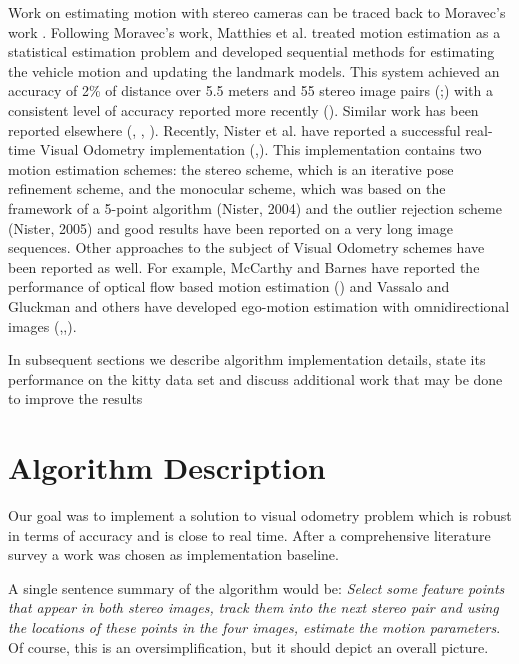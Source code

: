 \documentclass[10pt]{article}         %
\begin{document}
Work on estimating motion with stereo cameras can be traced back to Moravec's work \cite{Moravec:1980:OAN:909315}. Following Moravec's work, Matthies et al. treated motion estimation as a statistical estimation problem and developed sequential methods for estimating the vehicle motion and updating the landmark models. This system achieved an accuracy of 2\% of distance over 5.5 meters and 55 stereo image pairs (\cite{Matthies87errormodeling};\cite{Matthies:1989:DSV:916891}) with a consistent level of accuracy reported more recently (\cite{olson2003rover}). Similar work has been reported elsewhere (\cite{zhang1988analysis}, \cite{lacroix1999rover}, \cite{nister2004visual}). Recently, Nister et al. have reported a successful real-time Visual Odometry implementation (\cite{nister2006visual},\cite{nister2004efficient}). This implementation contains two motion estimation schemes: the stereo scheme, which is an iterative pose refinement scheme, and the monocular scheme, which was based on the framework of a 5-point algorithm (Nister, 2004) and the outlier rejection scheme (Nister, 2005) and good results have been reported on a very long image sequences. Other approaches to the subject of Visual Odometry schemes have been reported as well.  For example, McCarthy and Barnes have reported the performance of optical flow based motion estimation (\cite{mccarthy2004performance}) and Vassalo and Gluckman and others have developed ego-motion estimation with omnidirectional images (\cite{vassallo2002general},\cite{gluckman1998},\cite{corke2004omnidirectional}).

In subsequent sections we describe algorithm implementation details, state its performance on the kitty data set and discuss additional work that may be done to improve the results


\section{Algorithm Description}
Our goal was to implement a solution to visual odometry problem which is robust in terms of accuracy and is close to real time. After a comprehensive literature survey a work \cite{Geiger2011IV} was chosen as implementation baseline. 

A single sentence summary of the algorithm would be: \emph{Select some feature points that appear in both stereo images, track them into the next stereo pair and using the locations of these points in the four images, estimate the motion parameters}.  Of course, this is an oversimplification, but it should depict an overall picture.
\end{document}
